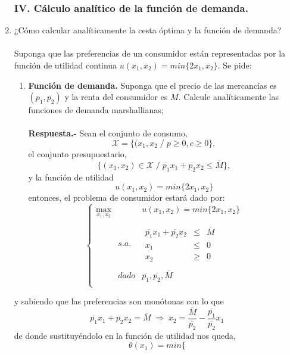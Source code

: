 \begin{enumerate}
\begin{center}
	\end{center}
	\vspace{1cm}



\subsubsection*{\center IV. Cálculo analítico de la función de demanda.}
\vspace{.5cm}

    \item ¿Cómo calcular analíticamente la cesta óptima y la función de demanda?\\\\
	Suponga que las preferencias de un consumidor están representadas por la función de utilidad continua $u(x_1, x_2) = min\lbrace2x_1, x_2\rbrace$. Se pide:

	\begin{enumerate}[\bfseries a)]

	    \item \textbf{Función de demanda.} Suponga que el precio de las mercancías es $(p_1, p_2)$ y la renta del consumidor es $M$. Calcule analíticamente las funciones de demanda marshallianas;\\\\
		\textbf{Respuesta.-}\; Sean el conjunto de consumo, $$\mathcal{X} = \lbrace (x_1,x_2 \; / \; p \geq 0, c\geq 0 \rbrace,$$
		el conjunto presupuestario, $$\lbrace(x_1,x_2)\in \mathcal{X} \; / \; \overline{p_1}x_1 + \overline{p_2} x_2 \leq \overline{M}\rbrace,$$
		y la función de utilidad $$u(x_1,x_2) = min\lbrace2x_1,x_2\rbrace$$
		entonces, el problema de consumidor estará dado por:
		$$\left\{\begin{array}{ccc}
			\max\limits_{x_1,x_2}&&u(x_1,x_2)=min\lbrace2x_1,x_2\rbrace\\\\
					     &s.a.&\begin{array}{rcl} \overline{p_1}x_1 + \overline{p_2}x_2&\leq &\overline{M}\\ x_1&\leq&0\\ x_2&\geq & 0 \end{array}\\\\
			   &dado&\overline{p_1},\overline{p_2},\overline{M}\\
		\end{array}\right.$$

	\end{enumerate}

	y sabiendo que las preferencias son monótonas con lo que $$\overline{p_1}x_1+\overline{p_2}x_2=\overline{M}\; \Longrightarrow \; x_2 = \dfrac{\overline{M}}{\overline{p_2}}-\dfrac{\overline{p_1}}{\overline{p_2}}x_1$$ de donde sustituyéndolo en la función de utilidad nos queda,
	$$\theta(x_1) = min\lbrace$$


\end{enumerate}
